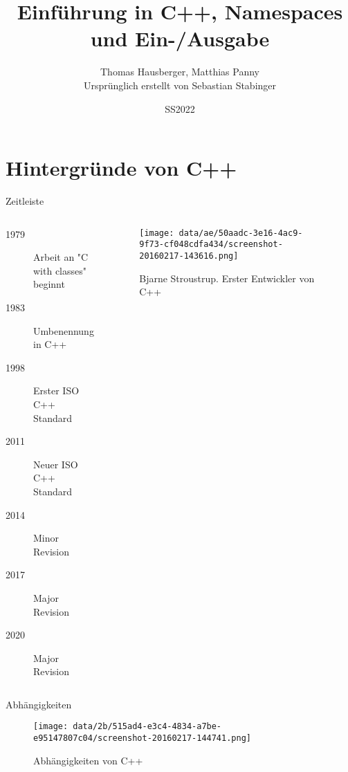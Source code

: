 \documentclass[presentation]{beamer}
\author{Thomas Hausberger, Matthias Panny \\ Ursprünglich erstellt von Sebastian Stabinger}
\date{SS2022}
\title{Einführung in C++, Namespaces und Ein-/Ausgabe}
\begin{document}
\maketitle

\section{Hintergründe von C++}
\label{sec:orgda574ad}
\begin{frame}[label={sec:org7ccc78a}]{Zeitleiste}
\begin{columns}
\begin{column}{0.5\columnwidth}
\begin{description}
\item[{1979}] Arbeit an "C with classes" beginnt
\item[{1983}] Umbenennung in C++
\item[{1998}] Erster ISO C++ Standard
\item[{2011}] \alert{Neuer ISO C++ Standard}
\item[{2014}] Minor Revision
\item[{2017}] Major Revision
\item[{2020}] Major Revision
\end{description}
\end{column}
\begin{column}{0.5\columnwidth}
\begin{figure}[htbp]
\centering
\texttt{[image: data/ae/50aadc-3e16-4ac9-9f73-cf048cdfa434/screenshot-20160217-143616.png]}
\caption{Bjarne Stroustrup. Erster Entwickler von C++}
\end{figure}
\end{column}
\end{columns}
\end{frame}
\begin{frame}[label={sec:org7afd9ff}]{Abhängigkeiten}
\begin{figure}[htbp]
\centering
\texttt{[image: data/2b/515ad4-e3c4-4834-a7be-e95147807c04/screenshot-20160217-144741.png]}
\caption{Abhängigkeiten von C++}
\end{figure}
\end{frame}
\end{document}
